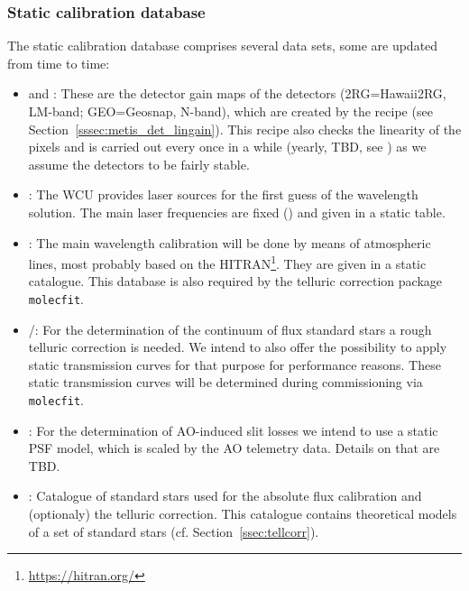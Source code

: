 \restoregeometry

\subsubsection{Static calibration database}\label{lss:static_calib}
The static calibration database comprises several data sets, some are updated from time to time:
\begin{itemize}
    \item \hyperref[dataitem:gain_map_lm]{} and \hyperref[dataitem:gain_map_n]{}: These are the detector gain maps of the detectors (2RG=Hawaii2RG, LM-band; GEO=Geosnap, N-band), which are created by the recipe \hyperref[sssec:metis_det_lingain]{} (see Section~\ref{sssec:metis_det_lingain}). This recipe also checks the linearity of the pixels and is carried out every once in a while (yearly, TBD, see \cite{METIS-calibration_plan}) as we assume the detectors to be fairly stable.
    \item \hyperref[dataitem:laser_tab]{}: The \ac{WCU} provides laser sources for the first guess of the wavelength solution. The main laser frequencies are fixed (\cite{METIS-calibration_plan}) and given in a static table.
    \item \hyperref[dataitem:atm_line_cat]{}: The main wavelength calibration will be done by means of atmospheric lines, most probably based on the \ac{HITRAN}\footnote{\url{https://hitran.org/}}. They are given in a static catalogue. This database is also required by the telluric correction package \texttt{molecfit}.
    \item \hyperref[dataitem:lm_synth_trans]{}/\hyperref[dataitem:n_synth_trans]{}: For the determination of the continuum of flux standard stars a rough telluric correction is needed. We intend to also offer the possibility to apply static transmission curves for that purpose for performance reasons. These static transmission curves will be determined during commissioning via \texttt{molecfit}.
    \item \hyperref[dataitem:ao_psf_model]{}: For the determination of \ac{AO}-induced slit losses we intend to use a static \ac{PSF} model, which is scaled by the \ac{AO} telemetry data. Details on that are TBD.
    \item \hyperref[dataitem:ref_std_cat]{}: Catalogue of standard stars used for the absolute flux calibration and (optionaly) the telluric correction. This catalogue contains theoretical models of a set of standard stars (cf. Section~\ref{ssec:tellcorr}). 

\end{itemize}
